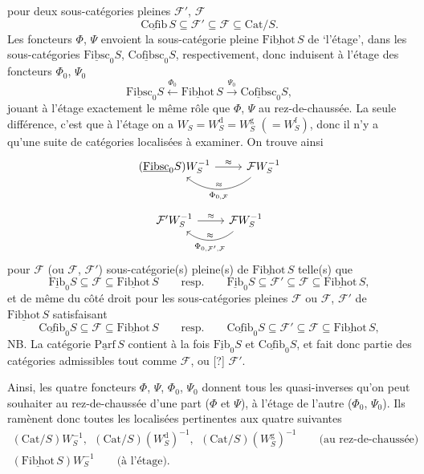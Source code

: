 \documentclass[11pt]{article}
\newcommand{\msp}[1]{\marginpar{\footnotesize [#1]}}
\newcommand{\usl}[1]{\underline{\mathrm{#1}}}
\begin{document}
pour deux sous-catégories pleines $\mathcal{F}'$, $\mathcal{F}$
\[
\usl{Cofib}\,S \subseteq \mathcal{F}' \subseteq \mathcal{F} \subseteq \mathrm{Cat}/S.
\]
Les foncteurs $\Phi$, $\Psi$ envoient la sous-catégorie pleine $\usl{Fibhot}\,S$ de ‘l’étage’, dans les sous-catégories $\usl{Fibsc}_0S$, $\usl{Cofibsc}_0S$, respectivement, donc induisent à l’étage des foncteurs $\Phi_0$, $\Psi_0$
\[
\usl{Fibsc}_0S \xleftarrow{\Phi_0} \usl{Fibhot}\,S \xrightarrow{\Psi_0} \usl{Cofibsc}_0S,
\]
jouant à l’étage exactement le même rôle que $\Phi$, $\Psi$ au rez-de-chaussée. La seule différence, c’est que à l’étage on a $W_S = W_S^{\mathrm{d}} = W_S^{\mathrm{g}}$ $(= W_S^{\mathrm{f}})$,
\msp{page 78}
donc il n’y a qu’une suite de catégories localisées à examiner. On trouve ainsi
\[
\begin{tikzcd}
(\usl{Fibsc}_0S)W_S^{-1} \arrow[r, "\approx"] & \mathcal{F}W_S^{-1} \arrow[l, bend left=40, "\approx"', "\Phi_{0,\mathcal{F}}"]
\end{tikzcd}
\]
\[
\begin{tikzcd}
\mathcal{F}'W_S^{-1} \arrow[r, "\approx"] & \mathcal{F}W_S^{-1} \arrow[l, bend left=40, "\approx"', "\Phi_{0,\mathcal{F}',\mathcal{F}}"]
\end{tikzcd}
\]
pour $\mathcal{F}$ (ou $\mathcal{F}$, $\mathcal{F}'$) sous-catégorie(s) pleine(s) de $\usl{Fibhot}\,S$ telle(s) que
\[
\usl{Fib}_0S \subseteq \mathcal{F} \subseteq \usl{Fibhot}\,S \qquad\text{resp.}\qquad \usl{Fib}_0S \subseteq \mathcal{F}' \subseteq \mathcal{F} \subseteq \usl{Fibhot}\,S,
\]
et de même du côté droit pour les sous-catégories pleines $\mathcal{F}$ ou $\mathcal{F}$, $\mathcal{F}'$ de $\usl{Fibhot}\,S$ satisfaisant
\[
\usl{Cofib}_0S \subseteq \mathcal{F} \subseteq \usl{Fibhot}\,S \qquad\text{resp.}\qquad \usl{Cofib}_0S \subseteq \mathcal{F}' \subseteq \mathcal{F} \subseteq \usl{Fibhot}\,S,
\]
NB. La catégorie $\usl{Parf}\,S$ contient à la fois $\usl{Fib}_0S$ et $\usl{Cofib}_0S$, et fait donc partie des catégories admissibles tout comme $\mathcal{F}$, ou [?] $\mathcal{F}'$.

Ainsi, les quatre foncteurs $\Phi$, $\Psi$, $\Phi_0$, $\Psi_0$ donnent tous les quasi-inverses qu’on peut souhaiter au rez-de-chaussée d’une part ($\Phi$ et $\Psi$), à l’étage de l’autre ($\Phi_0$, $\Psi_0$). Ils ramènent donc toutes les localisées pertinentes aux quatre suivantes
\[
\begin{gathered}
(\mathrm{Cat}/S)W_S^{-1},\ \ (\mathrm{Cat}/S)(W_S^{\mathrm{d}})^{-1},\ \ (\mathrm{Cat}/S)(W_S^{\mathrm{g}})^{-1} \qquad \text{(au rez-de-chaussée)}\\
(\usl{Fibhot}\,S)W_S^{-1} \qquad \text{(à l’étage).}
\end{gathered}
\]
\end{document}
